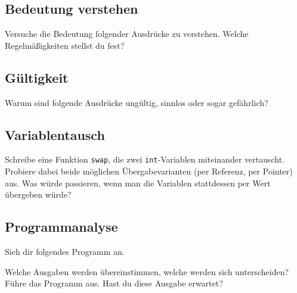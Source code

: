 
\subsection{Bedeutung verstehen}
Versuche die Bedeutung folgender Ausdrücke zu verstehen.
Welche Regelmäßigkeiten stellst du fest?



\subsection{Gültigkeit}
Warum sind folgende Ausdrücke ungültig, sinnlos oder sogar gefährlich?



\subsection{Variablentausch}
Schreibe eine Funktion \lstinline{swap}, die zwei \lstinline{int}-Variablen miteinander vertauscht.
Probiere dabei beide möglichen Übergabevarianten (per Referenz, per Pointer) aus.
Was würde passieren, wenn man die Variablen stattdessen per Wert übergeben würde?

\subsection{Programmanalyse}
Sieh dir folgendes Programm an.


Welche Ausgaben werden übereinstimmen, welche werden sich unterscheiden?
Führe das Programm aus.
Hast du diese Ausgabe erwartet?

